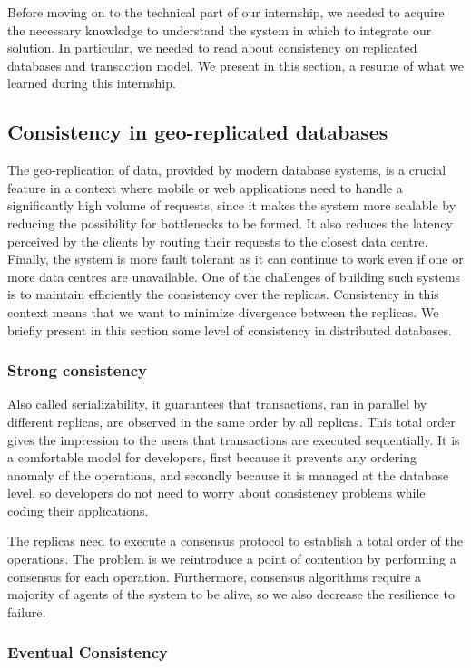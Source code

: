 \documentclass[11pt]{article}
\begin{document}
Before moving on to the technical part of our internship, we needed to acquire
the necessary knowledge to understand the system in which to integrate our
solution. In particular, we needed to read about consistency on replicated
databases and transaction model. We present in this section, a resume of what
we learned during this internship.

\subsection{Consistency in geo-replicated databases}
  
The geo-replication of data, provided by modern database systems, is a crucial
feature in a context where mobile or web applications need to handle a
significantly high volume of requests, since it makes the system more scalable
by reducing the possibility for bottlenecks to be formed. It also reduces the
latency perceived by the clients by routing their requests to the closest data
centre. Finally, the system is more fault tolerant as it can continue to work
even if one or more data centres are unavailable. One of the challenges of
building such systems is to maintain efficiently the consistency over the
replicas. Consistency in this context means that we want to minimize
divergence between the replicas. We briefly present in this section some level
of consistency in distributed databases.

\subsubsection{Strong consistency}
Also called serializability, it guarantees that transactions, ran in parallel
by different replicas, are observed in the same order by all replicas. This
total order gives the impression to the users that transactions are executed
sequentially. It is a comfortable model for developers, first because it
prevents any ordering anomaly of the operations, and secondly because it is
managed at the database level, so developers do not need to worry about
consistency problems while coding their applications.

The replicas need to execute a consensus protocol to establish a total order
of the operations. The problem is we reintroduce a point of contention by
performing a consensus for each operation. Furthermore, consensus algorithms
require a majority of agents of the system to be alive, so we also decrease
the resilience to failure.

\subsubsection{Eventual Consistency}
\end{document}
